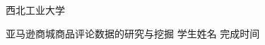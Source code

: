 \begin{titlepage}
    \voffset 2.7cm
    \begin{center}
        \begin{center}
            \begin{minipage}[c]{2.64cm}
                \centering
                \resizebox{!}{0.9cm}{ \parbox{0.54cm}{  } }
                \end{minipage}
                \hskip 0.8cm
                \begin{minipage}[c]{8cm}
                \fontsize{33}{33}\fNWPU 西北工业大学
            \end{minipage}
        \end{center}
        \vskip 0.7cm
        \sErhao{}
        \vskip 1cm
        {
            \sErhao\fHei 亚马逊商城商品评论数据的研究与挖掘
        }
        \vskip 2cm
        {
            \sSihao\fSong 学生姓名
            \vskip 0.7cm
            \sSihao\fSong 完成时间
            \vfill
        }
    \end{center}
\end{titlepage}
\fSong \normalsize

\endinput
